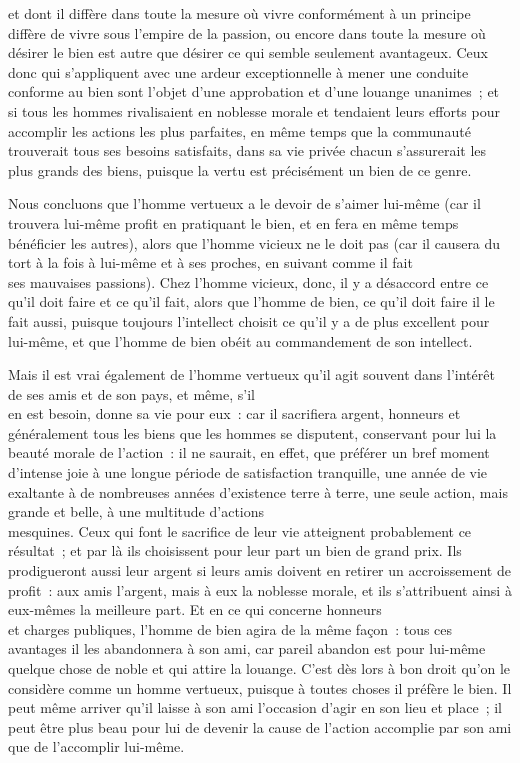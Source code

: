 \documentclass[french,twoside]{book} %
\begin{document}
et dont il diffère dans toute la mesure où vivre conformément à un principe diffère de vivre sous l’empire de la passion, ou encore dans toute la mesure où désirer le bien est autre que désirer ce qui semble seulement avantageux. Ceux donc qui s’appliquent avec une ardeur exceptionnelle à mener une conduite conforme au bien sont l’objet d’une approbation et d’une louange unanimes ; et si tous les hommes rivalisaient en noblesse morale et tendaient leurs efforts pour accomplir les actions les plus parfaites, en même temps que la communauté \\
trouverait tous ses besoins satisfaits, dans sa vie privée chacun s’assurerait les plus grands des biens, puisque la vertu est précisément un bien de ce genre.\par
Nous concluons que l’homme vertueux a le devoir de s’aimer lui-même (car il trouvera lui-même profit en pratiquant le bien, et en fera en même temps bénéficier les autres), alors que l’homme vicieux ne le doit pas (car il causera du tort à la fois à lui-même et à ses proches, en suivant comme il fait \\
ses mauvaises passions). Chez l’homme vicieux, donc, il y a désaccord entre ce qu’il doit faire et ce qu’il fait, alors que l’homme de bien, ce qu’il doit faire il le fait aussi, puisque toujours l’intellect choisit ce qu’il y a de plus excellent pour lui-même, et que l’homme de bien obéit au commandement de son intellect.\par
Mais il est vrai également de l’homme vertueux qu’il agit souvent dans l’intérêt de ses amis et de son pays, et même, s’il \\
en est besoin, donne sa vie pour eux : car il sacrifiera argent, honneurs et généralement tous les biens que les hommes se disputent, conservant pour lui la beauté morale de l’action : il ne saurait, en effet, que préférer un bref moment d’intense joie à une longue période de satisfaction tranquille, une année de vie exaltante à de nombreuses années d’existence terre à terre, une seule action, mais grande et belle, à une multitude d’actions \\
mesquines. Ceux qui font le sacrifice de leur vie atteignent probablement ce résultat ; et par là ils choisissent pour leur part un bien de grand prix. Ils prodigueront aussi leur argent si leurs amis doivent en retirer un accroissement de profit : aux amis l’argent, mais à eux la noblesse morale, et ils s’attribuent ainsi à eux-mêmes la meilleure part. Et en ce qui concerne honneurs \\
et charges publiques, l’homme de bien agira de la même façon : tous ces avantages il les abandonnera à son ami, car pareil abandon est pour lui-même quelque chose de noble et qui attire la louange. C’est dès lors à bon droit qu’on le considère comme un homme vertueux, puisque à toutes choses il préfère le bien. Il peut même arriver qu’il laisse à son ami l’occasion d’agir en son lieu et place ; il peut être plus beau pour lui de devenir la cause de l’action accomplie par son ami que de l’accomplir lui-même.\par
\end{document}
